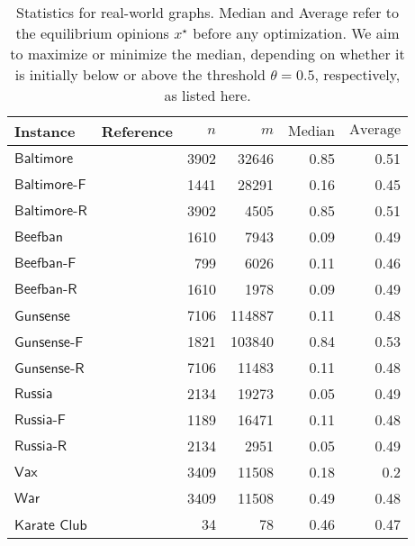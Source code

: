 \begin{table}
  \caption{Statistics for real-world graphs. Median
  and Average refer to the equilibrium opinions $x^\star$
  before any optimization.
  We aim to maximize or minimize the median, depending
  on whether it is initially below or above the
  threshold $\theta=0.5$,
  respectively, as listed here.}
  \centering
  \medskip
  \label{tab:stats}
  \setlength{\tabcolsep}{4pt}
  \begin{tabular}{llrrrr}
    \toprule
    Instance & Reference & $n$ & $m$ & $\mathrm{Median}$ & $\mathrm{Average}$ \\
    \midrule

$\textsf{Baltimore}$&\cite{garimella18}&3902&32646&0.85&0.51 \\
$\textsf{Baltimore-F}$&&1441&28291&0.16&0.45 \\
$\textsf{Baltimore-R}$&&3902&4505&0.85&0.51 \\
$\textsf{Beefban}$&&1610&7943&0.09&0.49 \\
$\textsf{Beefban-F}$&&799&6026&0.11&0.46 \\
$\textsf{Beefban-R}$&&1610&1978&0.09&0.49 \\
$\textsf{Gunsense}$&&7106&114887&0.11&0.48 \\
$\textsf{Gunsense-F}$&&1821&103840&0.84&0.53 \\
$\textsf{Gunsense-R}$&&7106&11483&0.11&0.48 \\
$\textsf{Russia}$&&2134&19273&0.05&0.49 \\
$\textsf{Russia-F}$&&1189&16471&0.11&0.48 \\
$\textsf{Russia-R}$&&2134&2951&0.05&0.49 \\  \midrule 
$\textsf{Vax}$&\cite{ristache2024wiser}&3409&11508&0.18&0.2 \\
$\textsf{War}$&&3409&11508&0.49&0.48 \\ \midrule
$\textsf{Karate Club}$&\cite{girvan2002community}&34&78&0.46&0.47 \\

  \bottomrule
\end{tabular}
\end{table}

